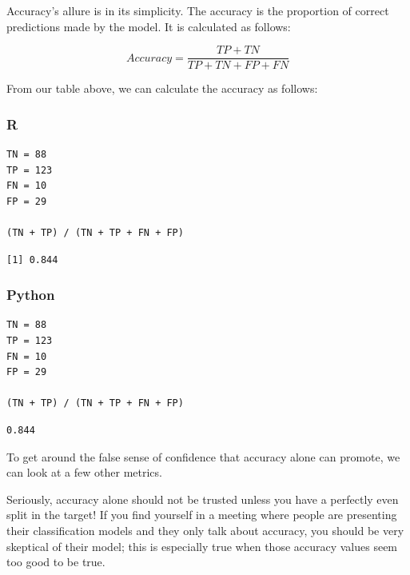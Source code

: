 \documentclass[
  letterpaper,
]{krantz}
\begin{document}
Accuracy's allure is in its simplicity. The accuracy is the proportion
of correct predictions made by the model. It is calculated as follows:

\[Accuracy = \frac{TP + TN}{TP + TN + FP + FN}\]

From our table above, we can calculate the accuracy as follows:

\subsubsection{R}

\begin{verbatim}
TN = 88
TP = 123
FN = 10
FP = 29

(TN + TP) / (TN + TP + FN + FP)
\end{verbatim}

\begin{verbatim}
[1] 0.844
\end{verbatim}

\subsubsection{Python}

\begin{verbatim}
TN = 88
TP = 123
FN = 10
FP = 29

(TN + TP) / (TN + TP + FN + FP)
\end{verbatim}

\begin{verbatim}
0.844
\end{verbatim}

To get around the false sense of confidence that accuracy alone can
promote, we can look at a few other metrics.

\begin{tcolorbox}[enhanced jigsaw, toprule=.15mm, colback=white, breakable, rightrule=.15mm, arc=.35mm, bottomrule=.15mm, opacityback=0, colframe=quarto-callout-warning-color-frame, leftrule=.75mm, left=2mm]
\begin{minipage}[t]{5.5mm}
\textcolor{quarto-callout-warning-color}{\faExclamationTriangle}
\end{minipage}%
\begin{minipage}[t]{\textwidth - 5.5mm}

Seriously, accuracy alone should not be trusted unless you have a
perfectly even split in the target! If you find yourself in a meeting
where people are presenting their classification models and they only
talk about accuracy, you should be very skeptical of their model; this
is especially true when those accuracy values seem too good to be true.

\end{minipage}%
\end{tcolorbox}
\end{document}

